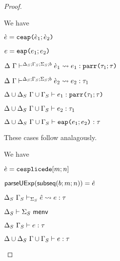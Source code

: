 \begin{proof}
\begin{byCases}
\item[\text{(\ref{rule:cvalidE-U-ap})}] We have
\begin{pfsteps*}
  \item $\grave{e}=\texttt{ceap}\texttt{(}\grave{e}_1; \grave{e}_2\texttt{)}$ 
  \item $e=\texttt{eap}\texttt{(}e_1; e_2\texttt{)}$ 
  \item $\Delta~\Gamma\vdash^{\Delta_S; \Gamma_S; \Sigma_S; b} \grave{e}_1 \leadsto e_1 : \texttt{parr}\texttt{(}\tau_1; \tau\texttt{)}$  
  \item $\Delta~\Gamma\vdash^{\Delta_S; \Gamma_S; \Sigma_S; b} \grave{e}_2 \leadsto e_2 : \tau_1$  
  \item $\Delta \cup \Delta_S~\Gamma \cup \Gamma_S \vdash e_1 : \texttt{parr}\texttt{(}\tau_1; \tau\texttt{)}$  
  \item $\Delta \cup \Delta_S~\Gamma \cup \Gamma_S \vdash e_2 : \tau_1$ 
  \item $\Delta \cup \Delta_S~\Gamma \cup \Gamma_S \vdash \texttt{eap}\texttt{(}e_1; e_2\texttt{)} : \tau$ 
\end{pfsteps*}
\resetpfcounter

\item[\text{(\ref{rule:cvalidE-U-tlam}) through (\ref{rule:cvalidE-U-case})}] These cases follow analagously.
\\

\item[\text{(\ref{rule:cvalidE-U-splicede})}] We have
\begin{pfsteps*}
  \item $\grave{e}=\texttt{cesplicede}[m; n]$ 
  \item $\mathsf{parseUExp}(\mathsf{subseq}(b; m; n))=\hat{e}$ 
  \item $\Delta_S~\Gamma_S \vdash_{\Sigma_S} \hat{e} \leadsto e : \tau$  
  \item $\Delta_S \vdash \Sigma_S~\mathsf{menv}$  
  \item $\Delta_S~\Gamma_S \vdash e : \tau$  
  \item $\Delta \cup \Delta_S~\Gamma \cup \Gamma_S \vdash e : \tau$ 
\end{pfsteps*}
\resetpfcounter
\end{byCases}
\end{proof}

